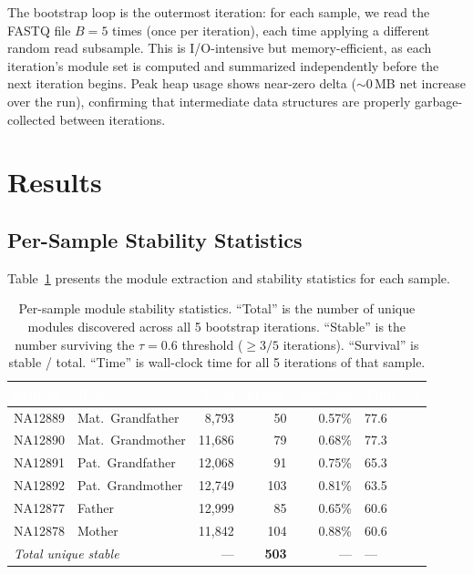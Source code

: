 \documentclass{../yalumba}
\begin{document}
The bootstrap loop is the outermost iteration: for each sample, we read the
FASTQ file $B = 5$ times (once per iteration), each time applying a different
random read subsample.  This is I/O-intensive but memory-efficient, as each
iteration's module set is computed and summarized independently before the next
iteration begins.  Peak heap usage shows near-zero delta ($\sim$0\,MB net
increase over the run), confirming that intermediate data structures are
properly garbage-collected between iterations.


\section{Results}
\label{sec:results}

\subsection{Per-Sample Stability Statistics}

Table~\ref{tab:stability-stats} presents the module extraction and stability
statistics for each sample.

\begin{table}[H]
  \centering
  \tablestyle
  \caption{Per-sample module stability statistics.  ``Total'' is the number of
    unique modules discovered across all 5 bootstrap iterations.  ``Stable'' is
    the number surviving the $\tau = 0.6$ threshold ($\geq 3/5$ iterations).
    ``Survival'' is stable / total.  ``Time'' is wall-clock time for all 5
    iterations of that sample.}
  \label{tab:stability-stats}
  \begin{tabular}{llrrrl}
    \toprule
    \rowcolor{table-header}
    \textcolor{white}{\textbf{Sample}} &
    \textcolor{white}{\textbf{Role}} &
    \textcolor{white}{\textbf{Total}} &
    \textcolor{white}{\textbf{Stable}} &
    \textcolor{white}{\textbf{Survival}} &
    \textcolor{white}{\textbf{Time (s)}} \\
    \midrule
    NA12889 & Mat.\ Grandfather & 8{,}793 & 50  & 0.57\% & 77.6 \\
    NA12890 & Mat.\ Grandmother & 11{,}686 & 79  & 0.68\% & 77.3 \\
    NA12891 & Pat.\ Grandfather & 12{,}068 & 91  & 0.75\% & 65.3 \\
    NA12892 & Pat.\ Grandmother & 12{,}749 & 103 & 0.81\% & 63.5 \\
    NA12877 & Father            & 12{,}999 & 85  & 0.65\% & 60.6 \\
    NA12878 & Mother            & 11{,}842 & 104 & 0.88\% & 60.6 \\
    \midrule
    \multicolumn{2}{l}{\textit{Total unique stable}} & --- & \textbf{503} & --- & --- \\
    \bottomrule
  \end{tabular}
\end{table}
\end{document}
